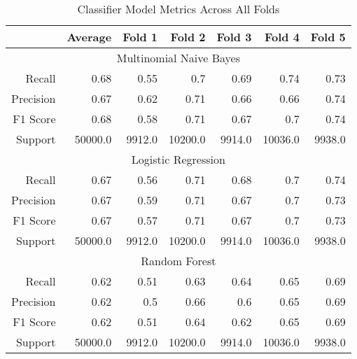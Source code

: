 \begin{table}[h]
    \centering
    \begin{tabular}{r|r|r|r|r|r|r}
        & Average & Fold 1 & Fold 2 & Fold 3 & Fold 4 & Fold 5 \\\hline
        \multicolumn{7}{c}{Multinomial Naive Bayes} \\\hline
        Recall      & 0.68 & 0.55 & 0.7 & 0.69 & 0.74 & 0.73 \\
        Precision   & 0.67 & 0.62 & 0.71 & 0.66 & 0.66 & 0.74 \\
        F1 Score    & 0.68 & 0.58 & 0.71 & 0.67 & 0.7 & 0.74 \\
        Support     & 50000.0 & 9912.0 & 10200.0 & 9914.0 & 10036.0 & 9938.0 \\\hline
        \multicolumn{7}{c}{Logistic Regression} \\\hline
        Recall      & 0.67 & 0.56 & 0.71 & 0.68 & 0.7 & 0.74 \\
        Precision   & 0.67 & 0.59 & 0.71 & 0.67 & 0.7 & 0.73 \\
        F1 Score    & 0.67 & 0.57 & 0.71 & 0.67 & 0.7 & 0.73 \\
        Support     & 50000.0 & 9912.0 & 10200.0 & 9914.0 & 10036.0 & 9938.0 \\\hline
        \multicolumn{7}{c}{Random Forest} \\\hline
        Recall      & 0.62 & 0.51 & 0.63 & 0.64 & 0.65 & 0.69 \\
        Precision   & 0.62 & 0.5 & 0.66 & 0.6 & 0.65 & 0.69 \\
        F1 Score    & 0.62 & 0.51 & 0.64 & 0.62 & 0.65 & 0.69 \\
        Support     & 50000.0 & 9912.0 & 10200.0 & 9914.0 & 10036.0 & 9938.0 \\\hline
    \end{tabular}
    \caption{Classifier Model Metrics Across All Folds}
    \label{tab:combined_fold_metrics}
\end{table}